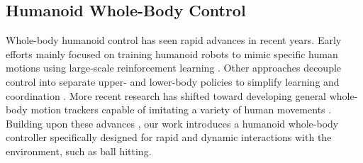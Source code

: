 \subsection{Humanoid Whole-Body Control}
Whole-body humanoid control has seen rapid advances in recent years.
Early efforts mainly focused on training humanoid robots to mimic specific human motions using large-scale reinforcement learning \cite{cheng2024expressive, he2024omnih2o}. Other approaches decouple control into separate upper- and lower-body policies to simplify learning and coordination \cite{zhang2025falcon}. 
More recent research has shifted toward developing general whole-body motion trackers capable of imitating a variety of human movements \cite{ze2025twist, chen2025gmt}.
Building upon these advances \cite{liao2025beyond}, our work introduces a humanoid whole-body controller specifically designed for rapid and dynamic interactions with the environment, such as ball hitting.